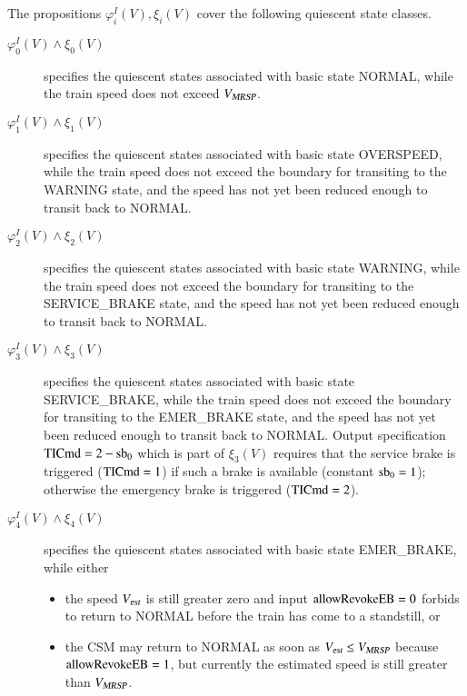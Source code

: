 The propositions $\varphi_i^I(V), \xi_i(V)$ cover the following quiescent state classes.
\begin{description}
\item[$\varphi_0^I(V)\wedge\xi_0(V)$] specifies the quiescent states associated with basic state {\sf NORMAL}, while the train speed does not exceed ${V_{\text{\sl MRSP}}}$.

 \item[$\varphi_1^I(V)\wedge\xi_1(V)$] specifies the quiescent states associated with basic state {\sf OVERSPEED}, while the train speed does not exceed the boundary for transiting to the {\sf WARNING} state, and the speed has not yet been reduced enough to transit back to {\sf NORMAL}.
 
\item[$\varphi_2^I(V)\wedge\xi_2(V)$] specifies the quiescent states associated with basic state 
 {\sf WARNING}, while the train speed does not exceed the boundary for transiting to the {\sf SERVICE\_BRAKE} state, and the speed has not yet been reduced enough to transit back to {\sf NORMAL}.
 
\item[$\varphi_3^I(V)\wedge\xi_3(V)$] specifies the quiescent states associated with basic state 
 {\sf SERVICE\_BRAKE}, while the train speed does not exceed the boundary for transiting to the {\sf EMER\_BRAKE} state, and the speed has not yet been reduced enough to transit back to {\sf NORMAL}. Output specification $\text{TICmd}=2 - \text{sb}_0$ which is part of $\xi_3(V)$ requires that the
 service brake is triggered ($\text{TICmd}=1$) if such a brake is available (constant $\text{sb}_0 = 1$); otherwise the emergency brake is triggered ($\text{TICmd}=2$).
 
\item[$\varphi_4^I(V)\wedge\xi_4(V)$] specifies the quiescent states associated with basic state
\newline 
{\sf EMER\_BRAKE}, while either
\begin{itemize}
\item the speed ${V_{\text{\sl est}}}$ is still greater zero and input $\text{allowRevokeEB} = 0$ forbids to return to {\sf NORMAL} before the train has come to a standstill,
 or
\item the CSM may return to  {\sf NORMAL} as soon as ${V_{\text{\sl est}}} \le {V_{\text{\sl MRSP}}}$ because 
$\text{allowRevokeEB} = 1$, but currently the estimated speed is still greater than ${V_{\text{\sl MRSP}}}$. 
\end{itemize}
\end{description}

